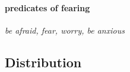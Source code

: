 \documentclass[a4,12pt]{scrartcl}
\begin{document}
\paragraph {\bf predicates of fearing} \cite[3.2.6]{noonan2007} {\it be afraid, fear, worry, be anxious} 




\subsection{Distribution}
\end{document}
